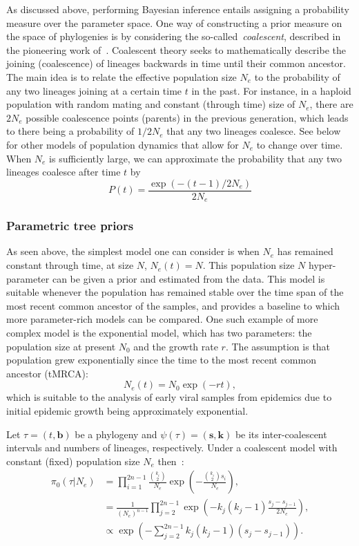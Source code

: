 As discussed above, performing Bayesian  inference entails assigning a probability measure over the parameter space.
One way of constructing a prior measure on the space of phylogenies is by considering the so-called~\textit{coalescent}, described in the pioneering work of~\cite{Kingman1982}.
Coalescent theory seeks to mathematically describe the joining (coalescence) of lineages backwards in time until their common ancestor.
The main idea is to relate the effective population size $N_e$ to the probability of any two lineages joining at a certain time $t$ in the past.
For instance, in a haploid population with random mating and constant (through time) size of $N_e$, there are $2N_e$ possible coalescence points (parents) in the previous generation, which leads to there being a probability of $1/2N_e$ that any two lineages coalesce.
See below for other models of population dynamics that allow for $N_e$ to change over time.
When $N_e$ is sufficiently large, we can approximate the probability that any two lineages coalesce after time $t$ by
$$ P(t) = \frac{\exp\left( -(t-1)/2N_e\right)}{2N_e}  $$

\subsubsection{Parametric tree priors}

As seen above, the simplest model one can consider is when $N_e$ has remained constant through time, at size $N$,  $N_e (t) = N$.
This population size $N$ hyper-parameter can be given a prior and estimated from the data.
This model is suitable whenever the population has remained stable over the time span of the most recent common ancestor of the samples, and provides a baseline to which more parameter-rich models can be compared.
One such example of more complex model is the exponential model, which has two parameters: the population size at present $N_0$ and the growth rate $r$.
The assumption is that population grew exponentially since the time to the most recent common ancestor (tMRCA):
$$ N_e(t) = N_0 \exp(-rt), $$
which is suitable to the analysis of early viral samples from epidemics due to initial epidemic growth being approximately exponential.

Let $\tau = (t, \boldsymbol b)$ be a phylogeny and $ \psi(\tau) = (\boldsymbol s, \boldsymbol k)$ be its inter-coalescent intervals and numbers of lineages, respectively.
Under a coalescent model with constant (fixed) population size $N_e$ then~\citep[Chapter 2]{Drummond2015}:
\begin{align}
\label{eq:coal_prior} 
\pi_0(\tau| N_e) &= \prod_{i= 1}^{2n-1} \frac{{k_i\choose 2}}{N_e}\exp\left(-\frac{{k_i\choose 2}s_i}{N_e}\right), \\
             &=  \frac{1}{(N_e)^{n-1}}\prod_{j = 2}^{2n-1}\exp\left(-k_j(k_j -1)\frac{s_j - s_{j-1}}{2N_e}\right), \\
             &\propto \exp\left(-\sum_{j=2}^{2n-1} k_j(k_j -1)(s_j - s_{j-1}) \right). \
\end{align}

